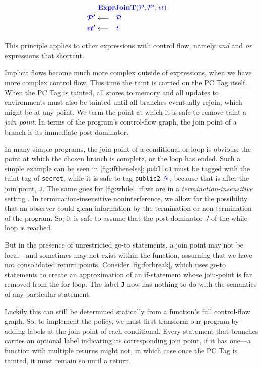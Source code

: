 \documentclass[acmsmall,review,anonymous]{acmart}\settopmatter{printfolios=true,printccs=false,printacmref=false}
\begin{document}
\[\begin{aligned}
\truledef{\exprjoint}
\settag{\PCT'}{\PCT}
\settag{\vt'}{\gentag}
\end{aligned}\]

This principle applies to other expressions with control flow, namely {\em and} and {\em or}
expressions that shortcut.

Implicit flows become much more complex outside of expressions, when we have more
complex control flow. This time the taint is carried on the PC Tag itself.
When the PC Tag is tainted, all stores to memory and all updates to environments must
also be tainted until all branches eventually rejoin, which might be at any point.
We term the point at which it is safe to remove taint a {\it join point}.
In terms of the program's control-flow graph, the
join point of a branch is its immediate post-dominator.

In many simple programs, the join point of a conditional or loop is obvious:
the point at which the chosen branch is complete, or the loop has ended.
Such a simple example can be seen in \cref{fig:ifthenelse}; {\tt public1} must be
tagged with the taint tag of {\tt secret}, while it is safe to tag {\tt public2}
\({\color{blue} N}\), because that is after the join point, {\tt J}. The same goes for \cref{fig:while},
if we are in a {\em termination-insensitive} setting \cite{Askarov08:TINILeaks}.
In termination-insensitive noninterference, we allow for the possibility that
an observer could glean information by the termination or non-termination of
the program. So, it is safe to assume that the post-dominator \(J\)
of the while loop is reached.

But in the presence of unrestricted go-to statements, a join point may not be
local---and sometimes may not exist within the function, assuming that we have not
consolidated return points. Consider \cref{fig:forbreak}, which
uses go-to statements to create an approximation of an if-statement whose join-point
is far removed from the for-loop. The label {\tt J} now has nothing to do with the
semantics of any particular statement.

Luckily this can still be determined statically from a function's full
control-flow graph. So, to implement the policy, we must first transform our program
by adding labels at the join point of each conditional.
Every statement that branches carries an optional label indicating its corresponding
join point, if it has one---a function with multiple returns might not, in which case
once the PC Tag is tainted, it must remain so until a return.
\end{document}
